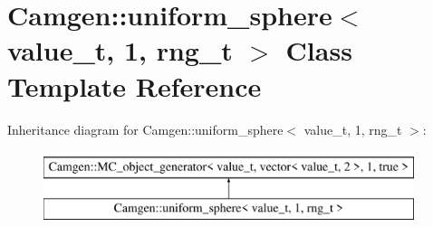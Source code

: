 \hypertarget{a00550}{\section{Camgen\-:\-:uniform\-\_\-sphere$<$ value\-\_\-t, 1, rng\-\_\-t $>$ Class Template Reference}
\label{a00550}
}
Inheritance diagram for Camgen\-:\-:uniform\-\_\-sphere$<$ value\-\_\-t, 1, rng\-\_\-t $>$\-:\begin{figure}[H]
\begin{center}
\leavevmode
\includegraphics[height=2.000000cm]{a00550}
\end{center}
\end{figure}
